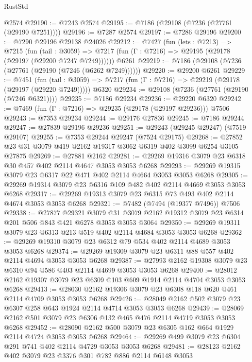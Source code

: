 \begin{lexlean}{RustStd}
\begin{coremodule}
    @2574
@29190 := @7243 @2574
@29195 := @7186 (@29108 (@7236 (@27761 (@29190 @7251))))
@29196 := @7287 @2574
@29197 := @7286 @29196
@29200 := @7290 @29196 @29138 @24026
@29212 := @7427
    (fun (lets : @7213) =>
    @7215
      (fun (tail : @3059) =>
      @7217 (fun (Γ : @7216) => @29195 (@29178 (@29197 (@29200 @7247 @7249))))))
    @6261
@29219 := @7186 (@29108 (@7236 (@27761 (@29190 (@7246 (@6262 @7249))))))
@29220 := @29200 @6261
@29229 := @7451
    (fun (tail : @3059) => @7217 (fun (Γ : @7216) => @29219 (@29178 (@29197 (@29220 @7249)))))
    @6320
@29234 := @29108 (@7236 (@27761 (@29190 (@7246 @6321))))
@29235 := @7186 @29234
@29236 := @29220 @6320
@29242 := @7469 (fun (Γ : @7216) => @29235 (@29178 (@29197 @29236))) @7506
@29243 := @7353 @29234
@29244 := @29176 @27836
@29245 := @7186 @29244
@29247 := @27839 @29196 @29236
@29251 := @29243 (@29245 @29247) (@7519 @29107)
@29255 := @7353 @29244 @29247 (@7524 @29175)
@29268 := @27852 @23 @31 @3079 @419 @2162 @19317 @3062 @6319 @402 @3099 @6254 @3105 @27875
@29269 := @27881 @2162
@29281 := @29269 @19316 @3079 @23 @6318 @30 @457 @402 @2114 @4647 @3053 @3053 @6268
@29293 := @29269 @19315 @3079 @23 @6317 @22 @471 @402 @2114 @4664 @3053 @3053 @6268
@29305 := @29269 @19314 @3079 @23 @6316 @109 @482 @402 @2114 @4669 @3053 @3053 @6268
@29317 := @29269 @19313 @3079 @23 @6315 @73 @493 @402 @2114 @4674 @3053 @3053 @6268
@29321 := @7482 (@7494 (@19377 @7496)) @7506
@29338 := @27877
    @29321
    @3079
    @31
    @3079
    @2162
    @19312
    @3079
    @23
    @6314
    @201
    @506
    @843
    @421
    @6278
    @3053
    @3053
    @3064
@29350 := @29269 @19311 @3079 @23 @6313 @213 @519 @402 @2114 @4684 @3053 @3053 @6268
@29362 := @29269 @19310 @3079 @23 @6312 @79 @534 @402 @2114 @4689 @3053 @3053 @6268
@29374 := @29269 @19309 @3079 @23 @6311 @88 @557 @402 @2114 @4694 @3053 @3053 @6268
@29387 := @27993 @2162 @19308 @3079 @23 @6310 @94 @586 @403 @2114 @4699 @3053 @3053 @6268
@29400 := @28012 @2162 @19307 @3079 @23 @6309 @103 @609 @1914 @2114 @4704 @3053 @3053 @6268
@29413 := @28030 @2162 @19306 @3079 @23 @6308 @118 @620 @461 @2114 @4709 @3053 @3053 @6268
@29426 := @28049 @2162 @502 @3079 @23 @6307 @258 @643 @1924 @2114 @4714 @3053 @3053 @6268
@29439 := @28069 @2162 @501 @3079 @23 @6306 @132 @465 @476 @2114 @4719 @3053 @3053 @6268
@29452 := @28090 @2162 @500 @3079 @23 @6305 @162 @664 @1929 @2114 @4724 @3053 @3053 @6268
@29464 := @29269 @499 @3079 @23 @6304 @291 @741 @402 @2114 @4729 @3053 @3053 @6268
@29481 := @28123
    @2162
    @402
    @3079
    @23
    @3376
    @301
    @782
    @886
    @2114
    @6148
    @3053

\end{coremodule}
\end{lexlean}
